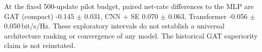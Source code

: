 At the fixed 500-update pilot budget, paired net-rate differences to the MLP are 
GAT (compact) -0.145 $\pm$ 0.031, CNN + SE 0.070 $\pm$ 0.063, Transformer -0.056 $\pm$ 0.050\,bit/s/Hz.
These exploratory intervals do not establish a universal architecture ranking or convergence of any model. The historical GAT superiority claim is not reinstated.
